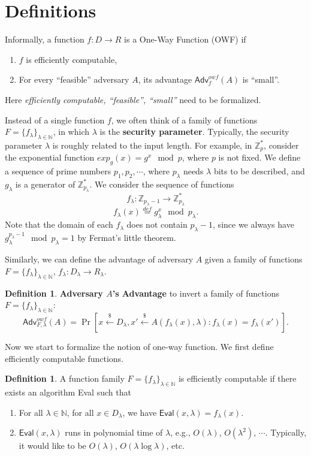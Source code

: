 \documentclass[12pt]{article}
\newcommand{\eqdef}{\stackrel{def}{=}}
\newcommand{\N}{\mathbb{N}}
\newcommand{\Z}{\mathbb{Z}}
\newcommand{\getsr}{\stackrel{\$}{\gets}}
\newcommand{\Adv}{\textsf{Adv}}
\theoremstyle{definition}
\newtheorem{definition}[theorem]{Definition}
\begin{document}
\section{Definitions}
Informally, a function $f:D\to R$ is a One-Way Function (OWF) if
\begin{enumerate}
\item $f$ is efficiently computable,
\item For every ``feasible'' adversary $A$, its advantage $\Adv_f^{owf}(A)$ is ``small''.
\end{enumerate}
Here \emph{efficiently computable, ``feasible'', ``small''} need to be formalized.

Instead of a single function $f$, we often think of a family of functions $F = \{f_\lambda\}_{\lambda\in\N}$, in which $\lambda$ is the {\bf security parameter}. Typically, the security parameter $\lambda$ is roughly related to the input length. For example, in $\Z_p^*$, consider the exponential function $exp_g(x) = g^x \mod p$, where $p$ is not fixed. We define a sequence of prime numbers $p_1, p_2, \cdots$, where $p_\lambda$ needs $\lambda$ bits to be described, and $g_\lambda$ is a generator of $\Z_{p_\lambda}^*$. We consider the sequence of functions
$$f_\lambda : \Z_{p_\lambda-1} \to \Z_{p_\lambda}^*$$
$$f_\lambda (x) \eqdef g_\lambda^x \mod p_\lambda. $$
Note that the domain of each $f_\lambda$ does not contain $p_\lambda-1$, since we always have $g_\lambda^{p_\lambda-1} \mod p_\lambda = 1$ by Fermat's little theorem.

Similarly, we can define the advantage of adversary $A$ given a family of functions $F = \{f_\lambda\}_{\lambda\in\N}$, $f_\lambda : D_\lambda \to R_\lambda$.
\begin{definition}
{\bf Adversary $A$'s Advantage} to invert a family of functions $F = \{f_\lambda\}_{\lambda\in\N}$:
$$\Adv_{F,\lambda}^{owf}(A) = \Pr [x\getsr D_\lambda, x'\getsr A(f_\lambda(x), \lambda) : f_\lambda(x)=f_\lambda(x')].$$
\end{definition}

Now we start to formalize the notion of one-way function. We first define efficiently computable functions.
\begin{definition}
A function family $F = \{f_\lambda\}_{\lambda\in\N}$ is efficiently computable if there exists an algorithm \textsf{Eval} such that
\begin{enumerate}
\item For all $\lambda\in\N$, for all $x\in D_\lambda$, we have $\textsf{Eval}(x, \lambda) = f_\lambda(x)$.
\item $\textsf{Eval}(x,\lambda)$ runs in polynomial time of $\lambda$, e.g., $O(\lambda)$, $O(\lambda^2)$, $\cdots$. Typically, it would like to be $O(\lambda)$, $O(\lambda \log \lambda)$, etc.
\end{enumerate}
\end{definition}
\end{document}
